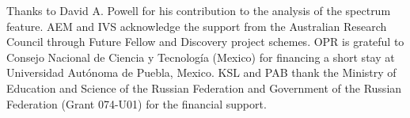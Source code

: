\documentclass[aps,prl,twocolumn,showpacs,superscriptaddress,groupedaddress]{revtex4-1}
\begin{document}
\begin{acknowledgments}
  Thanks to David A. Powell for his contribution to the analysis of
  the spectrum feature.  AEM and IVS acknowledge the support
  from the Australian Research Council through Future Fellow and
  Discovery project schemes. OPR is grateful to Consejo Nacional de
  Ciencia y Tecnolog\'{i}a (Mexico) for financing a short stay at
  Universidad Autónoma de Puebla, Mexico.  KSL and PAB thank the
  Ministry of Education and Science of the Russian Federation and
  Government of the Russian Federation (Grant 074-U01) for the
  financial support.
\end{acknowledgments}


\end{document}
